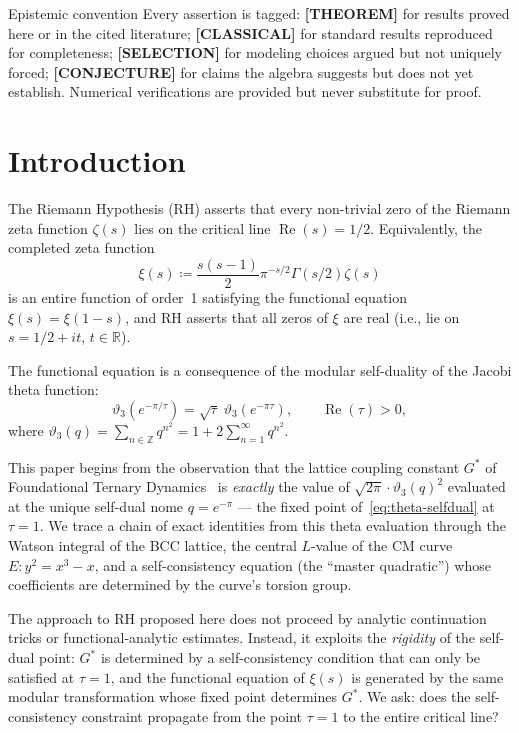 \documentclass[11pt]{article}
\theoremstyle{tight}
\theoremstyle{plainroman}
\newcommand{\R}{\mathbb{R}}
\newcommand{\Z}{\mathbb{Z}}
\begin{document}
\begin{statusbox}{Epistemic convention}
Every assertion is tagged: \textbf{[THEOREM]} for results proved here or in the cited literature; \textbf{[CLASSICAL]} for standard results reproduced for completeness; \textbf{[SELECTION]} for modeling choices argued but not uniquely forced; \textbf{[CONJECTURE]} for claims the algebra suggests but does not yet establish.
Numerical verifications are provided but never substitute for proof.
\end{statusbox}

\section{Introduction}

The Riemann Hypothesis (RH) asserts that every non-trivial zero of the Riemann zeta function $\zeta(s)$ lies on the critical line $\operatorname{Re}(s)=1/2$.
Equivalently, the completed zeta function
\[
\xi(s)\coloneqq \frac{s(s-1)}{2}\pi^{-s/2}\Gamma(s/2)\zeta(s)
\]
is an entire function of order~1 satisfying the functional equation $\xi(s)=\xi(1-s)$, and RH asserts that all zeros of $\xi$ are real (i.e., lie on $s=1/2+it$, $t\in\R$).

The functional equation is a consequence of the modular self-duality of the Jacobi theta function:
\begin{equation}\label{eq:theta-selfdual}
\vartheta_3(e^{-\pi/\tau})=\sqrt{\tau}\;\vartheta_3(e^{-\pi\tau}), \qquad \operatorname{Re}(\tau)>0,
\end{equation}
where $\vartheta_3(q)=\sum_{n\in\Z}q^{n^2}=1+2\sum_{n=1}^\infty q^{n^2}$.

This paper begins from the observation that the lattice coupling constant $G^*$ of Foundational Ternary Dynamics~\cite{ftdspec} is \emph{exactly} the value of $\sqrt{2\pi}\cdot\vartheta_3(q)^2$ evaluated at the unique self-dual nome $q=e^{-\pi}$ --- the fixed point of~\eqref{eq:theta-selfdual} at $\tau=1$.
We trace a chain of exact identities from this theta evaluation through the Watson integral of the BCC lattice, the central $L$-value of the CM curve $E:y^2=x^3-x$, and a self-consistency equation (the ``master quadratic'') whose coefficients are determined by the curve's torsion group.

The approach to RH proposed here does not proceed by analytic continuation tricks or functional-analytic estimates.
Instead, it exploits the \emph{rigidity} of the self-dual point: $G^*$ is determined by a self-consistency condition that can only be satisfied at $\tau=1$, and the functional equation of $\xi(s)$ is generated by the same modular transformation whose fixed point determines $G^*$.
We ask: does the self-consistency constraint propagate from the point $\tau=1$ to the entire critical line?
\end{document}
